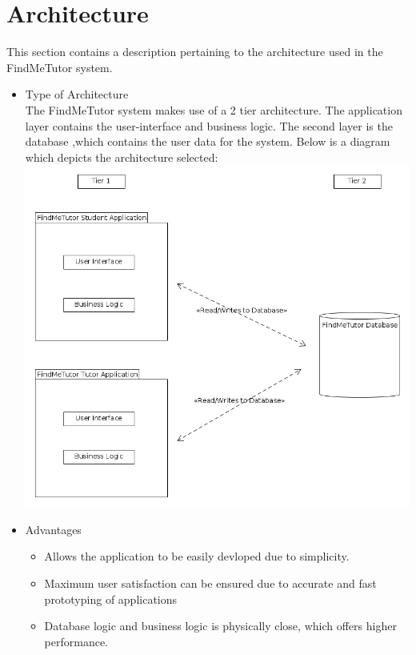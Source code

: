 \documentclass[12pt]{article}
\begin{document}
\pagebreak

\section{Architecture}
This section contains a description pertaining to the architecture used in the FindMeTutor system.

\begin{itemize}
\item Type of Architecture\\
The FindMeTutor system makes use of a 2 tier architecture. The application layer contains the user-interface and business logic. The second layer is the database ,which contains the user data for the system. Below is a diagram which depicts the architecture selected:\\
\includegraphics[width=140mm]{./2_Tier_Diagram.png}\\

\item Advantages
\begin{itemize}
\item Allows the application to be easily devloped due to simplicity.
\item Maximum user satisfaction can be ensured due to accurate and fast prototyping of applications
\item Database logic and business logic is physically close, which offers higher performance.\\
\end{itemize}


\end{itemize}
\end{document}
